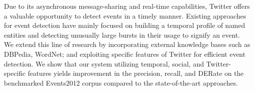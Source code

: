 
Due to its asynchronous message-sharing and real-time capabilities, Twitter offers a valuable opportunity to detect events in a timely manner. Existing approaches for event detection have mainly focused on building a temporal profile of named entities and detecting unusually large bursts in their usage to signify an event. We extend this line of research by incorporating external knowledge bases such as DBPedia, WordNet; and exploiting specific features of Twitter for efficient event detection. We show that our system utilizing temporal, social, and Twitter-specific features yields improvement in the precision, recall, and DERate on the benchmarked Events2012 corpus compared to the state-of-the-art approaches.


